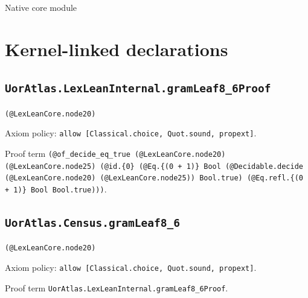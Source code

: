 \documentclass[11pt]{article}
\begin{document}
\begin{center}{\LARGE Native core module}\end{center}
\section*{Kernel-linked declarations}
\subsection*{\texttt{UorAtlas.LexLeanInternal.gramLeaf8\_6Proof}}
\noindent\texttt{(@LexLeanCore.node20)}\par
\noindent Axiom policy: \texttt{allow [Classical.choice, Quot.sound, propext]}.\par
\noindent Proof term \texttt{(@of\_decide\_eq\_true (@LexLeanCore.node20) (@LexLeanCore.node25) (@id.\{0\} (@Eq.\{(0 + 1)\} Bool (@Decidable.decide (@LexLeanCore.node20) (@LexLeanCore.node25)) Bool.true) (@Eq.refl.\{(0 + 1)\} Bool Bool.true)))}.\par
\subsection*{\texttt{UorAtlas.Census.gramLeaf8\_6}}
\noindent\texttt{(@LexLeanCore.node20)}\par
\noindent Axiom policy: \texttt{allow [Classical.choice, Quot.sound, propext]}.\par
\noindent Proof term \texttt{UorAtlas.LexLeanInternal.gramLeaf8\_6Proof}.\par
\end{document}
